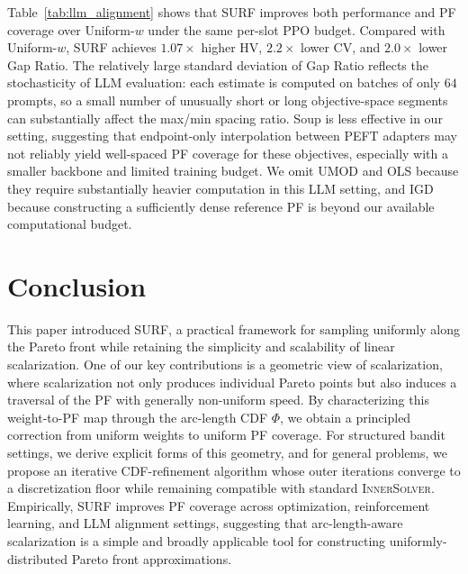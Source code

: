 \documentclass{article}
\newcommand{\Farc}{\Phi}
\begin{document}
Table~\ref{tab:llm_alignment} shows that SURF improves both performance and PF coverage over Uniform-$w$ under the same per-slot PPO budget. 
Compared with Uniform-$w$, SURF achieves $1.07\times$ higher HV, $2.2\times$ lower CV, and $2.0\times$ lower Gap Ratio. 
The relatively large standard deviation of Gap Ratio reflects the stochasticity of LLM evaluation: each estimate is computed on batches of only $64$ prompts, so a small number of unusually short or long objective-space segments can substantially affect the max/min spacing ratio. 
Soup is less effective in our setting, suggesting that endpoint-only interpolation between PEFT adapters may not reliably yield well-spaced PF coverage for these objectives, especially with a smaller backbone and limited training budget.
We omit UMOD and OLS because they require substantially heavier computation in this LLM setting, and IGD because constructing a sufficiently dense reference PF is beyond our available computational budget.

\vspace{-0.3cm}
\section{Conclusion}
\label{sec:conclusion}
\vspace{-0.4cm}
This paper introduced SURF, a practical framework for sampling uniformly along the Pareto front while retaining the simplicity and scalability of linear scalarization. 
One of our key contributions is a geometric view of scalarization, where scalarization not only produces individual Pareto points but also induces a traversal of the PF with generally non-uniform speed. 
By characterizing this weight-to-PF map through the arc-length CDF $\Farc$, we obtain a principled correction from uniform weights to uniform PF coverage. 
For structured bandit settings, we derive explicit forms of this geometry, and for general problems, we propose an iterative CDF-refinement algorithm whose outer iterations converge to a discretization floor while remaining compatible with standard \textsc{InnerSolver}. 
Empirically, SURF improves PF coverage across optimization, reinforcement learning, and LLM alignment settings,
suggesting that arc-length-aware scalarization is a simple and broadly applicable tool for constructing uniformly-distributed Pareto front approximations.


{\small }

\newpage


\appendix
\startcontents[appendix]
\end{document}
